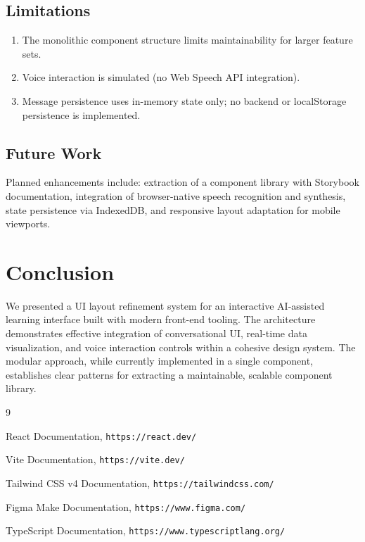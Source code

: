 \documentclass[11pt,a4paper]{article}
\begin{document}
\subsection{Limitations}

\begin{enumerate}
  \item The monolithic component structure limits maintainability for larger feature sets.
  \item Voice interaction is simulated (no Web Speech API integration).
  \item Message persistence uses in-memory state only; no backend or localStorage persistence is implemented.
\end{enumerate}

\subsection{Future Work}

Planned enhancements include: extraction of a component library with Storybook documentation, integration of browser-native speech recognition and synthesis, state persistence via IndexedDB, and responsive layout adaptation for mobile viewports.

\section{Conclusion}

We presented a UI layout refinement system for an interactive AI-assisted learning interface built with modern front-end tooling. The architecture demonstrates effective integration of conversational UI, real-time data visualization, and voice interaction controls within a cohesive design system. The modular approach, while currently implemented in a single component, establishes clear patterns for extracting a maintainable, scalable component library.

\begin{thebibliography}{9}

React Documentation,
\texttt{https://react.dev/}

Vite Documentation,
\texttt{https://vite.dev/}

Tailwind CSS v4 Documentation,
\texttt{https://tailwindcss.com/}

Figma Make Documentation,
\texttt{https://www.figma.com/}

TypeScript Documentation,
\texttt{https://www.typescriptlang.org/}

\end{thebibliography}
\end{document}
